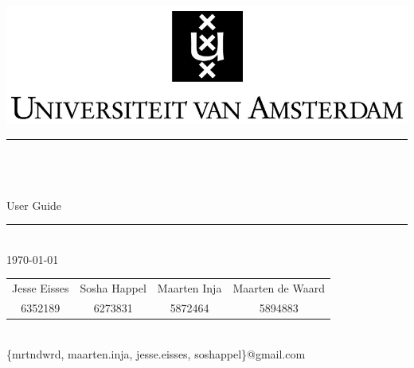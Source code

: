 \newcommand{\HRule}{\rule{\linewidth}{0.5mm}}

\begin{titlepage}
\begin{center}
\includegraphics[width=1\textwidth]{uva}\\[0.5cm]

\HRule \\[0.2cm]
{ \huge \LARGE \textbf{\projectName}\\[0.1cm]
\large \textsc{\projectAbbreviation}\\[0.15cm]
\Large User Guide
 \vspace{0.2cm}}
\HRule \\[0.4cm]
\Large \today

\vfill

\begin{tabular}{cccc}
Jesse Eisses & Sosha Happel & Maarten Inja & Maarten de Waard \\ 
6352189 & 6273831 & 5872464 & 5894883 
\end{tabular} \\[0.3cm]

\large \{mrtndwrd, maarten.inja, jesse.eisses, soshappel\}@gmail.com 
\end{center}
\end{titlepage}

%
%
